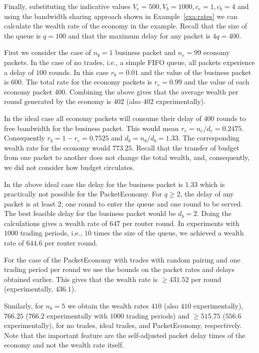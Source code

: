 \documentclass[letterpaper,10pt]{llncs}
\newcommand{\hla}[1]{\hl{#1}}
\renewcommand{\hla}[1]{#1}
\begin{document}
Finally, substituting the indicative values $V_e = 500, V_b = 1000, c_e = 1, c_b = 4$ 
and using the bandwidth sharing approach shown in Example~\ref{exa:rates}
we can calculate the wealth rate of the economy in the example.
Recall that the size of the queue is $q=100$ and that the maximum delay for
any packet is $4q = 400$.

\hla{First we consider the case of $n_b=1$ business packet and $n_e=99$ economy packets.
In the case of no trades, i.e., a simple FIFO queue, all packets experience a delay 
of $100$ rounds. 
In this case $r_b = 0.01$ and the value of the business packet is $600$.
The total rate for the economy packets is $r_e = 0.99$ and the value of each 
economy packet $400$. Combining the above gives that the average wealth per 
round generated by the economy is $402$ (also $402$ experimentally). 

In the ideal case all economy packets will consume their delay of $400$ rounds
to free bandwidth for the business packet. This would mean
$r_e = n_e/d_e = 0.2475$. Consequently $r_b = 1 - r_e = 0.7525$
and $d_b = n_b/d_b = 1.33$. The corresponding wealth rate for the economy 
would $773.25$. Recall that the transfer of budget from one packet to another 
does not change the total wealth, and, consequently,
we did not consider how budget circulates.

In the above ideal case the delay for the business packet is $1.33$
which is practically not possible for the PacketEconomy. For $q \geq 2$, the delay 
of any packet is at least $2$; one round to enter the queue and one round to be served. 
The best feasible delay for the business packet would be $d_b = 2$.
Doing the calculations gives a wealth rate of $647$ per router round. 
In experiments with $1000$ trading periods, i.e., $10$ times the size of the queue, 
we achieved a wealth rate of $644.6$ per router round.

For the case of the PacketEconomy with trades with random pairing and 
one trading period per round we use the bounds on the packet rates and
delays obtained earlier. This gives that the wealth rate is $\geq 431.52$
per round (experimentally, $436.1$).

Similarly, for $n_b=5$ we obtain the wealth rates $410$ (also $410$ experimentally), $766.25$ ($766.2$ experimentally with $1000$ trading periods) and $\geq 515.75$ ($556.6$ experimentally), 
for no trades, ideal trades, and PacketEconomy, respectively.
Note that the important feature are the self-adjusted packet delay times of 
the economy and not the wealth rate itself.
}
\end{document}
